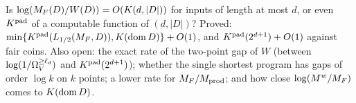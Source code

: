 \begin{question}\label{q:versions:open}
Is $\log(M_{F}(D)/W(D))=O(K(d,|D|))$ for inputs of length at most $d$, or even $K^{\mathrm{pad}}$ of a computable function of $(d,|D|)$? Proved: $\min\{K^{\mathrm{pad}}(L_{1/2}(M_{F},D)),K(\operatorname{dom} D)\}+O(1)$, and $K^{\mathrm{pad}}(2^{d+1})+O(1)$ against fair coins. Also open: the exact rate of the two-point gap of $W$ (between $\log(1/\Omega_{V}^{\ge \ell_d})$ and $K^{\mathrm{pad}}(2^{d+1})$); whether the single shortest program has gaps of order $\log k$ on $k$ points; a lower rate for $M_{F}/M_{\mathrm{prod}}$; and how close $\log(M^{w}/M_{F})$ comes to $K(\operatorname{dom} D)$.
\end{question}
